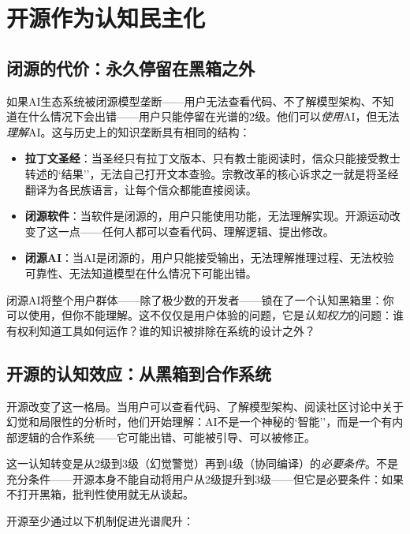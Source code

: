 \documentclass[12pt,a4paper]{ctexart}
\begin{document}
\section{开源作为认知民主化}

\subsection{闭源的代价：永久停留在黑箱之外}

如果AI生态系统被闭源模型垄断——用户无法查看代码、不了解模型架构、不知道在什么情况下会出错——用户只能停留在光谱的2级。他们可以\emph{使用}AI，但无法\emph{理解}AI。这与历史上的知识垄断具有相同的结构：

\begin{itemize}
\item \textbf{拉丁文圣经}：当圣经只有拉丁文版本、只有教士能阅读时，信众只能接受教士转述的`结果''，无法自己打开文本查验。宗教改革的核心诉求之一就是将圣经翻译为各民族语言，让每个信众都能直接阅读。
\item \textbf{闭源软件}：当软件是闭源的，用户只能使用功能，无法理解实现。开源运动改变了这一点——任何人都可以查看代码、理解逻辑、提出修改。
\item \textbf{闭源AI}：当AI是闭源的，用户只能接受输出，无法理解推理过程、无法校验可靠性、无法知道模型在什么情况下可能出错。
\end{itemize}

闭源AI将整个用户群体——除了极少数的开发者——锁在了一个认知黑箱里：你可以使用，但你不能理解。这不仅仅是用户体验的问题，它是\textit{认知权力}的问题：谁有权利知道工具如何运作？谁的知识被排除在系统的设计之外？

\subsection{开源的认知效应：从黑箱到合作系统}

开源改变了这一格局。当用户可以查看代码、了解模型架构、阅读社区讨论中关于幻觉和局限性的分析时，他们开始理解：AI不是一个神秘的`智能''，而是一个有内部逻辑的合作系统——它可能出错、可能被引导、可以被修正。

这一认知转变是从2级到3级（幻觉警觉）再到4级（协同编译）的\textit{必要条件}。不是充分条件——开源本身不能自动将用户从2级提升到3级——但它是必要条件：如果不打开黑箱，批判性使用就无从谈起。

开源至少通过以下机制促进光谱爬升：
\end{document}
